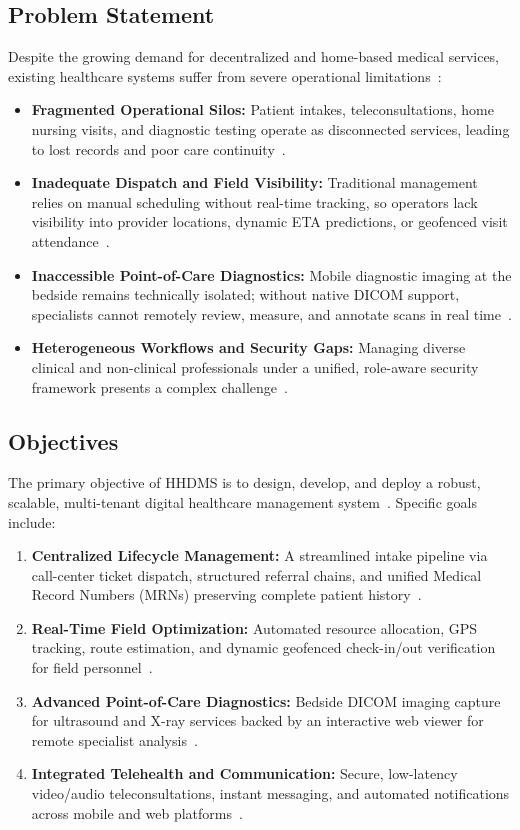 \documentclass[conference]{IEEEtran}
\begin{document}
\subsection{Problem Statement}
Despite the growing demand for decentralized and home-based medical services, existing healthcare systems suffer from severe operational limitations~:
\begin{itemize}
\item \textbf{Fragmented Operational Silos:} Patient intakes, teleconsultations, home nursing visits, and diagnostic testing operate as disconnected services, leading to lost records and poor care continuity~\cite{srs2026}.
\item \textbf{Inadequate Dispatch and Field Visibility:} Traditional management relies on manual scheduling without real-time tracking, so operators lack visibility into provider locations, dynamic ETA predictions, or geofenced visit attendance~\cite{zandbergen2009accuracy}.
\item \textbf{Inaccessible Point-of-Care Diagnostics:} Mobile diagnostic imaging at the bedside remains technically isolated; without native DICOM support, specialists cannot remotely review, measure, and annotate scans in real time~\cite{pacs2001, dicom2021}.
\item \textbf{Heterogeneous Workflows and Security Gaps:} Managing diverse clinical and non-clinical professionals under a unified, role-aware security framework presents a complex challenge~.
\end{itemize}

\subsection{Objectives}
The primary objective of HHDMS is to design, develop, and deploy a robust, scalable, multi-tenant digital healthcare management system~\cite{srs2026}. Specific goals include:
\begin{enumerate}
\item \textbf{Centralized Lifecycle Management:} A streamlined intake pipeline via call-center ticket dispatch, structured referral chains, and unified Medical Record Numbers (MRNs) preserving complete patient history~\cite{srs2026}.
\item \textbf{Real-Time Field Optimization:} Automated resource allocation, GPS tracking, route estimation, and dynamic geofenced check-in/out verification for field personnel~\cite{zandbergen2009accuracy}.
\item \textbf{Advanced Point-of-Care Diagnostics:} Bedside DICOM imaging capture for ultrasound and X-ray services backed by an interactive web viewer for remote specialist analysis~\cite{dicom2021, pacs2001}.
\item \textbf{Integrated Telehealth and Communication:} Secure, low-latency video/audio teleconsultations, instant messaging, and automated notifications across mobile and web platforms~\cite{fette2011websocket, agorawebrtc}.
\end{enumerate}
\end{document}
